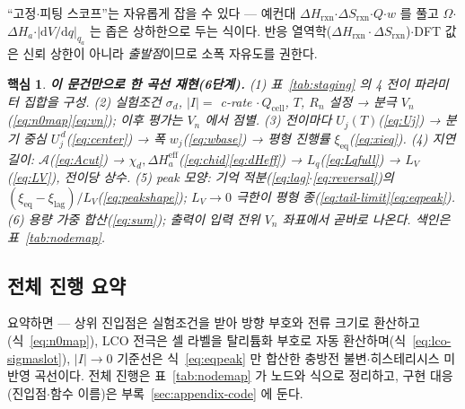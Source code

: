 \documentclass[11pt,a4paper]{article}
\newtheorem*{keybox}{핵심}
\newcommand{\dd}{\mathrm{d}}
\newcommand{\eff}{\mathrm{eff}}
\newcommand{\eq}{\mathrm{eq}}
\newcommand{\cell}{\mathrm{cell}}
\newcommand{\rxn}{\mathrm{rxn}}
\begin{document}
``고정$\cdot$피팅 스코프''는 자유롭게 잡을 수 있다 — 예컨대
$\Delta H_\rxn$$\cdot$$\Delta S_\rxn$$\cdot$$Q$$\cdot$$w$ 를 풀고 $\Omega$$\cdot$$\Delta H_a$$\cdot$$|\dd V/\dd q|_{q_a}$
는 좁은 상하한으로 두는 식이다. 반응 열역학($\Delta H_\rxn\cdot\Delta S_\rxn$)$\cdot$DFT 값은 신뢰 상한이 아니라
\emph{출발점}이므로 소폭 자유도를 권한다.

\begin{keybox}
\textbf{이 문건만으로 한 곡선 재현(6단계).}
(1) 표~\ref{tab:staging} 의 4 전이 파라미터 집합을 구성.
(2) 실험조건 $\sigma_d$, $|I|=$ c-rate$\,\cdot Q_\cell$, $T$, $R_n$ 설정 → 분극 $V_n$(\eqref{eq:n0map}\eqref{eq:vn}); 이후 평가는 $V_n$ 에서 점별.
(3) 전이마다 $U_j(T)$(\eqref{eq:Uj}) → 분기 중심 $U_j^{\,d}$(\eqref{eq:center}) → 폭 $w_j$(\eqref{eq:wbase}) → 평형 진행률 $\xi_\eq$(\eqref{eq:xieq}).
(4) 지연 길이: $\mathcal A$(\eqref{eq:Acut}) → $\chi_d,\Delta H_a^\eff$(\eqref{eq:chid}\eqref{eq:dHeff}) → $L_q$(\eqref{eq:Lqfull}) → $L_V$(\eqref{eq:LV}), 전이당 상수.
(5) peak 모양: 기억 적분(\eqref{eq:lag}$\cdot$\eqref{eq:reversal})의 $(\xi_\eq-\xi_\mathrm{lag})/L_V$(\eqref{eq:peakshape}); $L_V\to0$ 극한이 평형 종(\eqref{eq:tail-limit}\eqref{eq:eqpeak}).
(6) 용량 가중 합산(\eqref{eq:sum}); 출력이 입력 전위 $V_n$ 좌표에서 곧바로 나온다. 색인은 표~\ref{tab:nodemap}.
\end{keybox}

\subsection{전체 진행 요약}\label{sec:facade}
요약하면 — 상위 진입점은 실험조건을 받아 방향 부호와 전류 크기로 환산하고(식~\eqref{eq:n0map}),
LCO 전극은 셀 라벨을 탈리튬화 부호로 자동 환산하며(식~\eqref{eq:lco-sigmaslot}), $|I|\to0$ 기준선은
식~\eqref{eq:eqpeak} 만 합산한 충방전 불변$\cdot$히스테리시스 미반영 곡선이다. 전체 진행은
표~\ref{tab:nodemap} 가 노드와 식으로 정리하고, 구현 대응(진입점$\cdot$함수 이름)은
부록~\ref{sec:appendix-code} 에 둔다.
\end{document}
